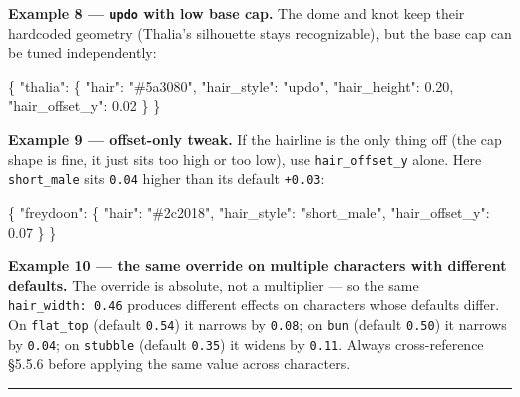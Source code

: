 \documentclass[
  12pt,
  letterpaper,
]{book}
\newenvironment{Shaded}{}{}
\newcommand{\DataTypeTok}[1]{\textcolor[rgb]{0.56,0.13,0.00}{#1}}
\newcommand{\FloatTok}[1]{\textcolor[rgb]{0.25,0.63,0.44}{#1}}
\newcommand{\FunctionTok}[1]{\textcolor[rgb]{0.02,0.16,0.49}{#1}}
\newcommand{\StringTok}[1]{\textcolor[rgb]{0.25,0.44,0.63}{#1}}
\begin{document}
\textbf{Example 8 --- \texttt{updo} with low base cap.} The dome and
knot keep their hardcoded geometry (Thalia's silhouette stays
recognizable), but the base cap can be tuned independently:

\begin{Shaded}
\begin{Highlighting}[]
\FunctionTok{\{}
  \DataTypeTok{"thalia"}\FunctionTok{:} \FunctionTok{\{}
    \DataTypeTok{"hair"}\FunctionTok{:}           \StringTok{"\#5a3080"}\FunctionTok{,}
    \DataTypeTok{"hair\_style"}\FunctionTok{:}     \StringTok{"updo"}\FunctionTok{,}
    \DataTypeTok{"hair\_height"}\FunctionTok{:}    \FloatTok{0.20}\FunctionTok{,}
    \DataTypeTok{"hair\_offset\_y"}\FunctionTok{:}  \FloatTok{0.02}
  \FunctionTok{\}}
\FunctionTok{\}}
\end{Highlighting}
\end{Shaded}

\textbf{Example 9 --- offset-only tweak.} If the hairline is the only
thing off (the cap shape is fine, it just sits too high or too low), use
\texttt{hair\_offset\_y} alone. Here \texttt{short\_male} sits
\texttt{0.04} higher than its default \texttt{+0.03}:

\begin{Shaded}
\begin{Highlighting}[]
\FunctionTok{\{}
  \DataTypeTok{"freydoon"}\FunctionTok{:} \FunctionTok{\{}
    \DataTypeTok{"hair"}\FunctionTok{:}          \StringTok{"\#2c2018"}\FunctionTok{,}
    \DataTypeTok{"hair\_style"}\FunctionTok{:}    \StringTok{"short\_male"}\FunctionTok{,}
    \DataTypeTok{"hair\_offset\_y"}\FunctionTok{:} \FloatTok{0.07}
  \FunctionTok{\}}
\FunctionTok{\}}
\end{Highlighting}
\end{Shaded}

\textbf{Example 10 --- the same override on multiple characters with
different defaults.} The override is absolute, not a multiplier --- so
the same \texttt{hair\_width:\ 0.46} produces different effects on
characters whose defaults differ. On \texttt{flat\_top} (default
\texttt{0.54}) it narrows by \texttt{0.08}; on \texttt{bun} (default
\texttt{0.50}) it narrows by \texttt{0.04}; on \texttt{stubble} (default
\texttt{0.35}) it widens by \texttt{0.11}. Always cross-reference
§5.5.6 before applying the same value across characters.

\begin{center}\rule{0.5\linewidth}{0.5pt}\end{center}
\end{document}
